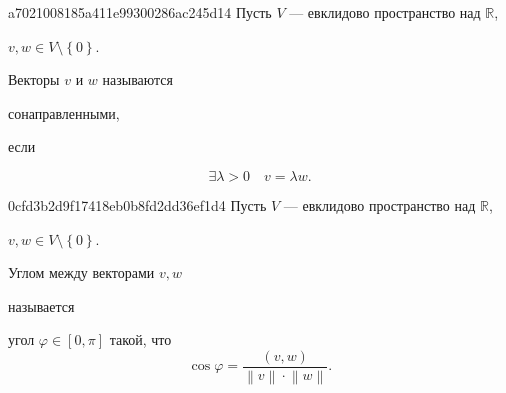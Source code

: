 \begin{note}{a7021008185a411e99300286ac245d14}
    Пусть \({ V }\) --- евклидово пространство над \({ \mathbb R }\),\: \begin{icloze}{3}\({ v, w \in V \setminus \left\{ 0 \right\} }\).\end{icloze}
    Векторы \({ v }\) и \({ w }\) называются \begin{icloze}{2}сонаправленными,\end{icloze} если
    \begin{icloze}{1}
        \[
            \exists \lambda > 0 \quad v = \lambda w.
        \]
    \end{icloze}
\end{note}

\begin{note}{0cfd3b2d9f17418eb0b8fd2dd36ef1d4}
    Пусть \({ V }\) --- евклидово пространство над \({ \mathbb R }\),\: \begin{icloze}{3}\({ v, w \in V \setminus \left\{ 0 \right\} }\).\end{icloze}
    \begin{icloze}{2}Углом между векторами \({ v, w }\)\end{icloze} называется \begin{icloze}{1}угол \({ \varphi \in \left[ 0, \pi \right] }\) такой, что
    \[
        \cos \varphi = \frac{(v, w)}{\left\lVert v \right\rVert \cdot \left\lVert w \right\rVert}.
    \]\end{icloze}
\end{note}


